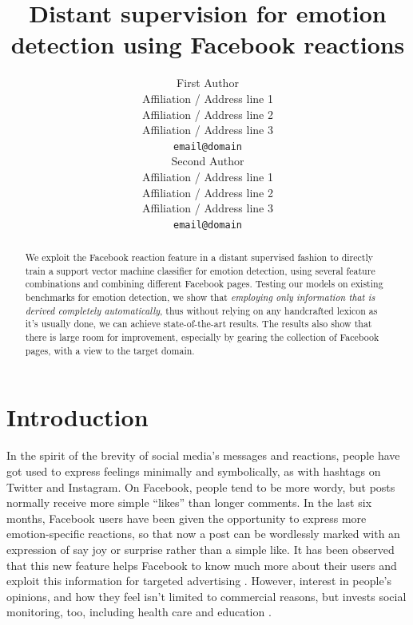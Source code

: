 \documentclass[11pt]{article}
\title{Distant supervision for emotion detection using Facebook reactions}
\author{First Author \\
  Affiliation / Address line 1 \\
  Affiliation / Address line 2 \\
  Affiliation / Address line 3 \\
  {\tt email@domain} \\\And
  Second Author \\
  Affiliation / Address line 1 \\
  Affiliation / Address line 2 \\
  Affiliation / Address line 3 \\
  {\tt email@domain} \\}
\date{}
\begin{document}
\maketitle
\begin{abstract}

We exploit the Facebook reaction feature in a distant supervised fashion to directly train a support vector machine classifier for emotion detection, using several feature combinations and combining different Facebook pages. Testing our models on existing benchmarks for emotion detection, we show that \textit{employing only information that is derived completely automatically}, thus without relying on any handcrafted lexicon as it's usually done, we can achieve state-of-the-art results. The results also show that there is large room for improvement, especially by gearing the collection of Facebook pages, with a view to the target domain. 

\end{abstract}





\section{Introduction}

In the spirit of the brevity of social media's messages and reactions, people have got used to express feelings minimally and symbolically, as with hashtags on Twitter and Instagram. On Facebook, people tend to be more wordy, but posts normally receive more simple ``likes'' than longer comments. In the last six months, Facebook users have been given the opportunity to express more emotion-specific reactions, so that now a post can be wordlessly marked with an expression of say joy or surprise rather than a simple like. It has been observed that this new feature helps Facebook to know much more about their users and exploit this information for targeted advertising \cite{wired}.  However, interest in people's opinions, and how they feel isn't limited to commercial reasons, but invests social monitoring, too, including health care and education \cite{SentimentEmotionSurvey2015}. 




\end{document}
